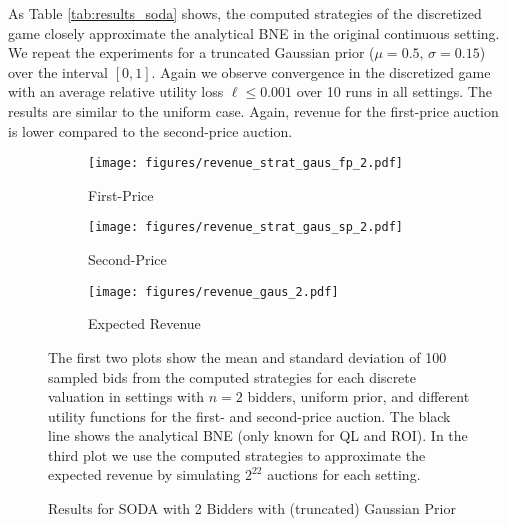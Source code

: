 \documentclass{article}
\begin{document}
\begin{appendix}

	
As Table \ref{tab:results_soda} shows, the computed strategies of the discretized game closely approximate the analytical BNE in the original continuous setting. 
We repeat the experiments for a truncated Gaussian prior ($\mu = 0.5, \, \sigma=0.15$) over the interval $[0,1]$. Again we observe convergence in the discretized game with an average relative utility loss $\ell \leq 0.001 $ over 10 runs in all settings. The results are similar to the uniform case. Again, revenue for the first-price auction is lower compared to the second-price auction.
	
\begin{figure}[h]
	\begin{center}
		\begin{subfigure}{0.32\textwidth}
		\centering
		\texttt{[image: figures/revenue\_strat\_gaus\_fp\_2.pdf]}
		\caption{First-Price}
		\end{subfigure}
		\begin{subfigure}{0.32\textwidth}
			\centering
			\texttt{[image: figures/revenue\_strat\_gaus\_sp\_2.pdf]}
			\caption{Second-Price}
		\end{subfigure}
		\begin{subfigure}{0.32\textwidth}
			\centering
			\texttt{[image: figures/revenue\_gaus\_2.pdf]}
			\caption{Expected Revenue}
		\end{subfigure}
	\caption{Results for SODA with 2 Bidders with (truncated) Gaussian Prior}
	\label{fig:soda_gaus}
	\end{center}
	\footnotesize
	The first two plots show the mean and standard deviation of 100 sampled bids from the computed strategies for each discrete valuation
	in settings with $n=2$ bidders, uniform prior, and different utility functions for the first- and second-price auction. The black line shows the analytical BNE (only known for QL and ROI).
	In the third plot we use the computed strategies to approximate the expected revenue by simulating $2^{22}$ auctions for each setting.
\end{figure}
	

\end{appendix}
\end{document}
